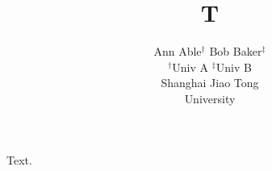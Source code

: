 \documentclass{article}
\title{T}
\author{Ann Able$^{\dagger}$ \quad Bob Baker$^{\ddagger}$ \\ $^\dagger$Univ A \quad $^\ddagger$Univ B \\ Shanghai Jiao Tong \\ University}
\begin{document}
\maketitle
Text.
\end{document}
